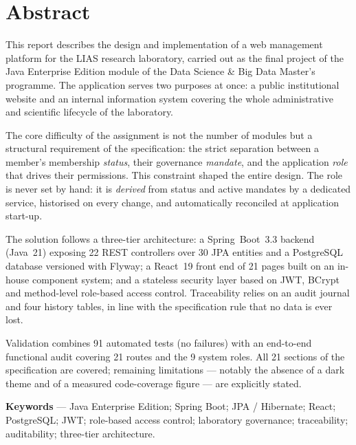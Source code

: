 \chapter*{Abstract}

This report describes the design and implementation of a web management platform for the
LIAS research laboratory, carried out as the final project of the Java Enterprise Edition
module of the Data Science \& Big Data Master's programme. The application serves two
purposes at once: a public institutional website and an internal information system
covering the whole administrative and scientific lifecycle of the laboratory.

The core difficulty of the assignment is not the number of modules but a structural
requirement of the specification: the strict separation between a member's membership
\emph{status}, their governance \emph{mandate}, and the application \emph{role} that
drives their permissions. This constraint shaped the entire design. The role is never set
by hand: it is \emph{derived} from status and active mandates by a dedicated service,
historised on every change, and automatically reconciled at application start-up.

The solution follows a three-tier architecture: a Spring~Boot~3.3 backend (Java~21)
exposing 22 REST controllers over 30 JPA entities and a PostgreSQL database versioned with
Flyway; a React~19 front end of 21 pages built on an in-house component system; and a
stateless security layer based on JWT, BCrypt and method-level role-based access control.
Traceability relies on an audit journal and four history tables, in line with the
specification rule that no data is ever lost.

Validation combines 91 automated tests (no failures) with an end-to-end functional audit
covering 21 routes and the 9 system roles. All 21 sections of the specification are
covered; remaining limitations --- notably the absence of a dark theme and of a measured
code-coverage figure --- are explicitly stated.

\vspace{4mm}
\noindent\textbf{Keywords} --- Java Enterprise Edition; Spring Boot; JPA / Hibernate;
React; PostgreSQL; JWT; role-based access control; laboratory governance; traceability;
auditability; three-tier architecture.

\cleardoublepage
\tableofcontents
\cleardoublepage
\listoffigures
{}
\cleardoublepage
\listoftables
{}

